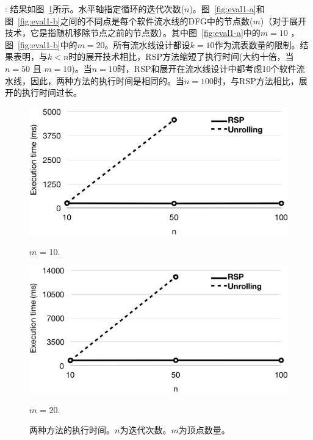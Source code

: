 : 结果如图~\ref{fig:eval1}所示。水平轴指定循环的迭代次数($n$)。图~\ref{fig:eval1-a}和图~\ref{fig:eval1-b}之间的不同点是每个软件流水线的DFG中的节点数($m$)（对于展开技术，它是指随机移除节点之前的节点数）。其中图~\ref{fig:eval1-a}中的$m = 10$ ，图~\ref{fig:eval1-b}中的$m = 20$。所有流水线设计都设$k=10$作为流表数量的限制。结果表明，与$k < n$时的展开技术相比，RSP方法缩短了执行时间(大约十倍，当$n = 50$ 且 $m = 10$)。当$n = 10$时，RSP和展开在流水线设计中都考虑10个软件流水线，因此，两种方法的执行时间是相同的。当$n = 100$时，与RSP方法相比，展开的执行时间过长。

\begin{figure}[!htbp]
    \centering
    \begin{minipage}{0.47\linewidth}
        \centering\includegraphics[width=\linewidth]{figures/lp-70.png}
        \caption{\label{fig:eval1-a} \small $m$ = 10.}
    \end{minipage}
    \begin{minipage}{0.47\linewidth}
        \centering\includegraphics[width=\linewidth]{figures/lp-71.png}
        \caption{\label{fig:eval1-b} \small $m$ = 20.}
    \end{minipage}
    \caption{\small 两种方法的执行时间。$n$为迭代次数。$m$为顶点数量。}
    \label{fig:eval1}
\end{figure}

